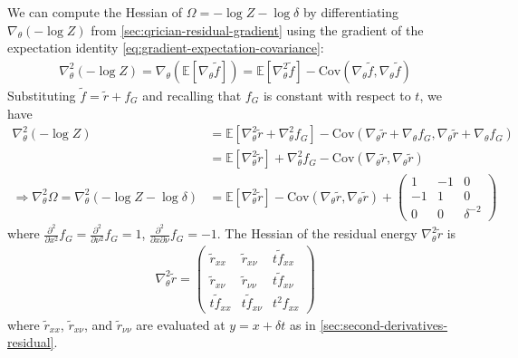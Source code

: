 \documentclass{article}
\begin{document}
We can compute the Hessian of $\Omega = -\log Z - \log\delta$ by differentiating $\nabla_{\theta} (-\log Z)$ from \cref{sec:qrician-residual-gradient} using the gradient of the expectation identity \cref{eq:gradient-expectation-covariance}:
%
\begin{align}
  \nabla_{\theta}^2 (-\log Z) = \nabla_\theta ( \mathbb{E}[\nabla_{\theta} \tilde{f}] ) = \mathbb{E}[\nabla_{\theta}^2 \tilde{f}] - \mathrm{Cov}(\nabla_{\theta} \tilde{f}, \nabla_{\theta} \tilde{f})
\end{align}
%
Substituting $\tilde{f} = \tilde{r} + f_G$ and recalling that $f_G$ is constant with respect to $t$, we have
%
\begin{align}
  \nabla_{\theta}^2 (-\log Z)                                                     & = \mathbb{E}[\nabla_{\theta}^2 \tilde{r} + \nabla_{\theta}^2 f_G] - \mathrm{Cov}(\nabla_{\theta} \tilde{r} + \nabla_{\theta} f_G, \nabla_{\theta} \tilde{r} + \nabla_{\theta} f_G)  \\
                                                                                  & = \mathbb{E}[\nabla_{\theta}^2 \tilde{r}] + \nabla_{\theta}^2 f_G - \mathrm{Cov}(\nabla_{\theta} \tilde{r}, \nabla_{\theta} \tilde{r}) \label{eq:residual-hessian-neglogz}          \\
  \Rightarrow \nabla_{\theta}^2 \Omega = \nabla_{\theta}^2 (-\log Z - \log\delta) & = \mathbb{E}[\nabla_{\theta}^2 \tilde{r}] - \mathrm{Cov}(\nabla_{\theta} \tilde{r}, \nabla_{\theta} \tilde{r}) + \begin{pmatrix} 1 & -1 & 0 \\ -1 & 1 & 0 \\ 0 & 0 & \delta^{-2} \end{pmatrix} \label{eq:residual-hessian-qrician}
\end{align}
%
where $\frac{\partial^2}{\partial x^2} f_G = \frac{\partial^2}{\partial \nu^2} f_G = 1$, $\frac{\partial^2}{\partial x \partial \nu} f_G = -1$.
The Hessian of the residual energy $\nabla_{\theta}^2 \tilde{r}$ is
%
\begin{align}
  \nabla_{\theta}^2 \tilde{r} = \begin{pmatrix} \tilde{r}_{xx} & \tilde{r}_{x\nu} & t \tilde{f}_{xx} \\ \tilde{r}_{x\nu} & \tilde{r}_{\nu\nu} & t \tilde{f}_{x\nu} \\ t \tilde{f}_{xx} & t \tilde{f}_{x\nu} & t^2 f_{xx} \end{pmatrix}
\end{align}
%
where $\tilde{r}_{xx}$, $\tilde{r}_{x\nu}$, and $\tilde{r}_{\nu\nu}$ are evaluated at $y=x+\delta t$ as in \cref{sec:second-derivatives-residual}.
\end{document}
